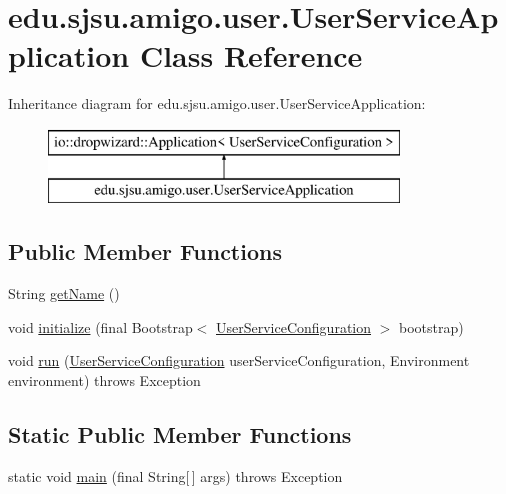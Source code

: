 \hypertarget{classedu_1_1sjsu_1_1amigo_1_1user_1_1_user_service_application}{}\section{edu.\+sjsu.\+amigo.\+user.\+User\+Service\+Application Class Reference}
\label{classedu_1_1sjsu_1_1amigo_1_1user_1_1_user_service_application}
Inheritance diagram for edu.\+sjsu.\+amigo.\+user.\+User\+Service\+Application\+:\begin{figure}[H]
\begin{center}
\leavevmode
\includegraphics[height=2.000000cm]{classedu_1_1sjsu_1_1amigo_1_1user_1_1_user_service_application}
\end{center}
\end{figure}
\subsection*{Public Member Functions}
\begin{DoxyCompactItemize}
\item 
String \hyperlink{classedu_1_1sjsu_1_1amigo_1_1user_1_1_user_service_application_a7f233d7a5f9b640b055edfd529f76b8a}{get\+Name} ()
\item 
void \hyperlink{classedu_1_1sjsu_1_1amigo_1_1user_1_1_user_service_application_a04efc0d795120671dcdd3f0936ab2a93}{initialize} (final Bootstrap$<$ \hyperlink{classedu_1_1sjsu_1_1amigo_1_1user_1_1_user_service_configuration}{User\+Service\+Configuration} $>$ bootstrap)
\item 
void \hyperlink{classedu_1_1sjsu_1_1amigo_1_1user_1_1_user_service_application_af49523f6ee55c6a49053dd6f8e34b13c}{run} (\hyperlink{classedu_1_1sjsu_1_1amigo_1_1user_1_1_user_service_configuration}{User\+Service\+Configuration} user\+Service\+Configuration, Environment environment)  throws Exception 
\end{DoxyCompactItemize}
\subsection*{Static Public Member Functions}
\begin{DoxyCompactItemize}
\item 
static void \hyperlink{classedu_1_1sjsu_1_1amigo_1_1user_1_1_user_service_application_a469bc4d2ead8252f9b98a2909ec436e0}{main} (final String\mbox{[}$\,$\mbox{]} args)  throws Exception 
\end{DoxyCompactItemize}


